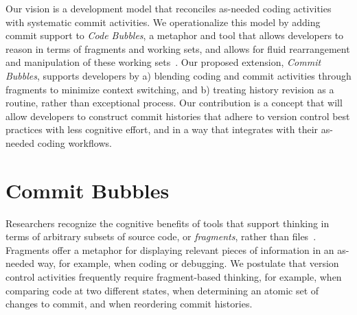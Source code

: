 \documentclass[conference]{IEEEtran}
\newcommand{\purpose}[1]{}
\begin{document}
\purpose{we envision a tool that treats history revision as routine and integrates it with coding} 
Our vision is a development model that reconciles as-needed coding activities with systematic commit activities.
We operationalize this model by adding commit support to \emph{Code Bubbles}, a metaphor and tool that allows developers
to reason in terms of fragments and working sets, and allows for fluid rearrangement and manipulation of these working sets~\cite{Bragdon2010a}.
Our proposed extension, \emph{Commit Bubbles}, supports developers by a) blending coding and commit activities through fragments to  
minimize context switching, and b) treating history revision as a routine, rather than exceptional process. 
Our contribution is a concept that will allow developers to construct commit histories that adhere to version control best practices with less cognitive effort, and in a way that integrates with their as-needed coding workflows.





\section{Commit Bubbles}


Researchers recognize the cognitive benefits of tools that support thinking in terms of arbitrary subsets of source code, or \emph{fragments}, rather than files~\cite{Bragdon2010a,DeLine2010a,Henley2014,Coblenz2006}.
Fragments offer a metaphor for displaying relevant pieces of information in an as-needed way, for example, when coding or debugging. 
We postulate that version control activities frequently require fragment-based thinking, for example, when comparing code at two different states, when determining an atomic set of changes to commit, and when reordering commit histories.
\end{document}
